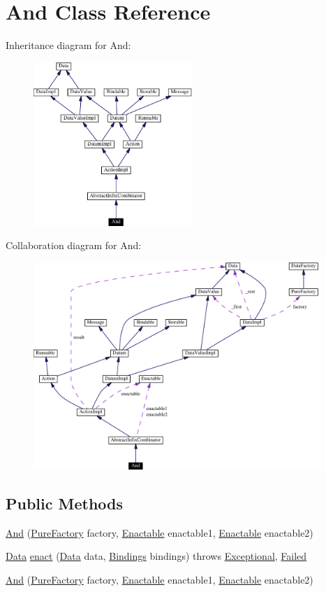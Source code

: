 \hypertarget{classAnd}{
\section{And  Class Reference}
\label{classAnd}
}
Inheritance diagram for And:\begin{figure}[H]
\begin{center}
\leavevmode
\includegraphics[width=170pt]{classAnd__inherit__graph}
\end{center}
\end{figure}
Collaboration diagram for And:\begin{figure}[H]
\begin{center}
\leavevmode
\includegraphics[width=308pt]{classAnd__coll__graph}
\end{center}
\end{figure}
\subsection*{Public Methods}
\begin{CompactItemize}
\item 
\hyperlink{classAnd_a0}{And} (\hyperlink{classPureFactory}{Pure\-Factory} factory, \hyperlink{interfaceEnactable}{Enactable} enactable1, \hyperlink{interfaceEnactable}{Enactable} enactable2)
\item 
\hyperlink{interfaceData}{Data} \hyperlink{classAnd_a1}{enact} (\hyperlink{interfaceData}{Data} data, \hyperlink{interfaceBindings}{Bindings} bindings) throws \hyperlink{classExceptional}{Exceptional}, \hyperlink{classFailed}{Failed}
\item 
\hyperlink{classAnd_a2}{And} (\hyperlink{classPureFactory}{Pure\-Factory} factory, \hyperlink{interfaceEnactable}{Enactable} enactable1, \hyperlink{interfaceEnactable}{Enactable} enactable2)
\end{CompactItemize}


